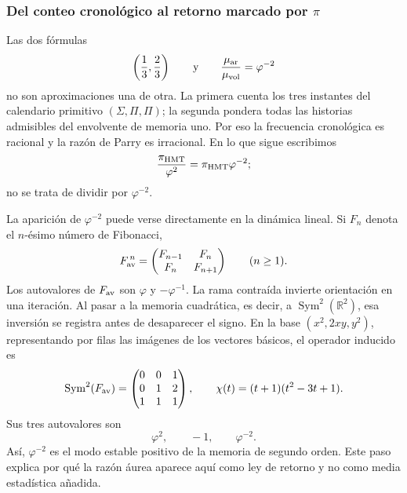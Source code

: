 \subsubsection{Del conteo cronológico al retorno marcado por \texorpdfstring{\(\pi\)}{π}}
\label{p12-83-c16-s2:sec:retorno-marcado-pi-phi2}

Las dos fórmulas
\[
 \left(\frac13,\frac23\right)
 \qquad\text{y}\qquad
 \frac{\mu_{\rm ar}}{\mu_{\rm vol}}=\varphi^{-2}
\]
no son aproximaciones una de otra. La primera cuenta los tres instantes del
calendario primitivo \((\Sigma,\Pi,\Pi)\); la segunda pondera todas las
historias admisibles del envolvente de memoria uno. Por eso la frecuencia
cronológica es racional y la razón de Parry es irracional. En lo que sigue
escribimos
\[
 \frac{\pi_{\rm HMT}}{\varphi^2}
 =\pi_{\rm HMT}\varphi^{-2};
\]
no se trata de dividir por \(\varphi^{-2}\).

La aparición de \(\varphi^{-2}\) puede verse directamente en la dinámica
lineal. Si \(F_n\) denota el \(n\)-ésimo número de Fibonacci,
\[
 F_{\rm av}^{\,n}
 =
 \begin{pmatrix}
  F_{n-1}&F_n\\
  F_n&F_{n+1}
 \end{pmatrix}
 \qquad(n\geq1).
\]
Los autovalores de \(F_{\rm av}\) son
\(\varphi\) y \(-\varphi^{-1}\). La rama contraída invierte orientación en
una iteración. Al pasar a la memoria cuadrática, es decir, a
\(\operatorname{Sym}^2(\mathbb R^2)\), esa inversión se registra antes de
desaparecer el signo. En la base \((x^2,2xy,y^2)\), representando por
filas las imágenes de los vectores básicos, el operador inducido es
\[
 \operatorname{Sym}^2(F_{\rm av})=
 \begin{pmatrix}
  0&0&1\\
  0&1&2\\
  1&1&1
 \end{pmatrix},
 \qquad
 \chi(t)=(t+1)(t^2-3t+1).
\]
Sus tres autovalores son
\[
 \varphi^2,\qquad -1,\qquad \varphi^{-2}.
\]
Así, \(\varphi^{-2}\) es el modo estable positivo de la memoria de segundo
orden. Este paso explica por qué la razón áurea aparece aquí como ley de
retorno y no como media estadística añadida.

